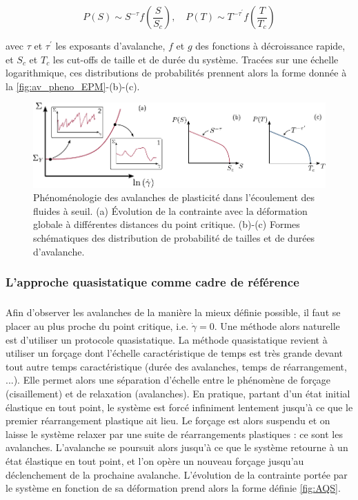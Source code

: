 \begin{equation}
	P(S) \sim S^{-\tau}f\left( \frac{S}{S_c} \right), \quad P(T) \sim T^{-\tau^\prime}f\left( \frac{T}{T_c} \right)
	\label{eq:AvalancheDistrib}
\end{equation}

\noindent avec $\tau$ et $\tau^\prime$ les exposants d'avalanche, $f$ et $g$ des fonctions à décroissance rapide, et $S_c$ et $T_c$ les cut-offs de taille et de durée du système. Tracées sur une échelle logarithmique, ces distributions de probabilités prennent alors la forme donnée à la \autoref{fig:av_pheno_EPM}-(b)-(c).

\begin{figure}[h]
	\centering
	\includegraphics[width=\textwidth]{Chapitre4/Figures/Avalanches/Pheno.pdf}
	\caption{Phénoménologie des avalanches de plasticité dans l'écoulement des fluides à seuil. (a) Évolution de la contrainte avec la déformation globale à différentes distances du point critique. (b)-(c) Formes schématiques des distribution de probabilité de tailles et de durées d'avalanche.}
	\label{fig:av_pheno_EPM}
\end{figure}

\subsubsection{L'approche quasistatique comme cadre de référence}

\subparagraph{}Afin d'observer les avalanches de la manière la mieux définie possible, il faut se placer au plus proche du point critique, i.e. $\dot{\gamma} = 0$. Une méthode alors naturelle est d'utiliser un protocole quasistatique. La méthode quasistatique revient à utiliser un forçage dont l'échelle caractéristique de temps est très grande devant tout autre temps caractéristique (durée des avalanches, temps de réarrangement, ...). Elle permet alors une séparation d'échelle entre le phénomène de forçage (cisaillement) et de relaxation (avalanches). En pratique, partant d'un état initial élastique en tout point, le système est forcé infiniment lentement jusqu'à ce que le premier réarrangement plastique ait lieu. Le forçage est alors suspendu et on laisse le système relaxer par une suite de réarrangements plastiques : ce sont les avalanches. L'avalanche se poursuit alors jusqu'à ce que le système retourne à un état élastique en tout point, et l'on opère un nouveau forçage jusqu'au déclenchement de la prochaine avalanche. L'évolution de la contrainte portée par le système en fonction de sa déformation prend alors la forme définie \autoref{fig:AQS}.

